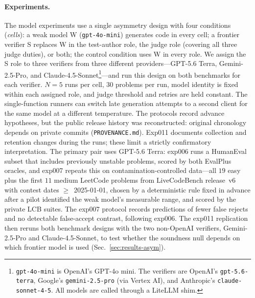 \paragraph{Experiments.} The model experiments use a single asymmetry design with four conditions
(\emph{cells}): a weak model W (\texttt{gpt-4o-mini}) generates code in every cell; a frontier
verifier S replaces W in the test-author role, the judge role (covering all three judge duties), or
both; the control condition uses W in every role. We assign the S role to three verifiers from
three different providers---GPT-5.6 Terra, Gemini-2.5-Pro, and Claude-4.5-Sonnet\footnote{\texttt{gpt-4o-mini} is
OpenAI's GPT-4o mini. The verifiers are OpenAI's \texttt{gpt-5.6-terra}, Google's \texttt{gemini-2.5-pro}
(via Vertex AI), and Anthropic's \texttt{claude-sonnet-4-5}. All models are called through a LiteLLM
shim.}---and run this design on both benchmarks for each verifier. $N{=}5$ runs per cell, $30$
problems per run, model identity is fixed within each assigned role, and judge threshold and retries are held
constant. The single-function runners can switch late generation attempts to a second client
for the same model at a different temperature. The protocols record advance hypotheses,
but the public release history was reconstructed: original chronology depends on private
commits (\texttt{PROVENANCE.md}). Exp011 documents collection and retention changes during
the runs; these limit a strictly confirmatory interpretation. The primary pair uses GPT-5.6 Terra: exp006 runs a HumanEval subset that
includes previously unstable problems, scored by both EvalPlus oracles, and exp007 repeats this
on contamination-controlled data---all $19$ easy plus the first $11$ medium LeetCode problems from
LiveCodeBench release~v6 with contest dates $\geq$~2025-01-01, chosen by a deterministic rule fixed
in advance after a pilot identified the weak model's measurable range, and scored by the private LCB
suites. The exp007 protocol records predictions of fewer false rejects and no detectable
false-accept contrast, following exp006. The exp011 replication then reruns
both benchmark designs with the two non-OpenAI verifiers, Gemini-2.5-Pro and Claude-4.5-Sonnet, to
test whether the soundness null depends on which frontier model is used (Sec.~\ref{sec:results-asym}).

